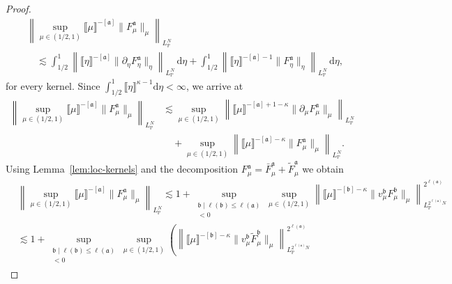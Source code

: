 \documentclass{article}
\numberwithin{equation}{section}
\newcommand{\mathd}{\mathrm{d}}
\theoremstyle{plain}
\theoremstyle{definition}
\begin{document}
\begin{proof}
\begin{align*}
    &\left\| \sup_{\mu \in (1 / 2, 1)}
    \llbracket \mu \rrbracket^{- [\mathfrak{a}]}
    \| F^{\mathfrak{a}}_{\mu} \|_{\mu} \right\|_{L^N_{\mathbb{P}}}\\
    &\quad \lesssim \int_{1 / 2}^1
    \left\| \llbracket \eta \rrbracket^{- [\mathfrak{a}]}
    \| \partial_{\eta} F^{\mathfrak{a}}_{\eta} \|_{\eta}
    \right\|_{L^N_{\mathbb{P}}}\,\mathd \eta
    + \int_{1 / 2}^1 \left\| \llbracket \eta \rrbracket^{- [\mathfrak{a}] - 1}
    \| F^{\mathfrak{a}}_{\eta} \|_{\eta}
    \right\|_{L^N_{\mathbb{P}}}\,\mathd \eta,
  \end{align*}
  for every kernel. Since $\int_{1 / 2}^1 \llbracket
  \eta \rrbracket^{\kappa - 1} \mathd \eta < \infty$, we arrive at
  \begin{align*}
    \left\| \sup_{\mu \in (1 / 2, 1)} \llbracket \mu \rrbracket^{- [\mathfrak{a}]}
    \| F^{\mathfrak{a}}_{\mu} \|_{\mu} \right\|_{L^N_{\mathbb{P}}}
    &\lesssim \sup_{\mu \in (1 / 2, 1)}
    \left\| \llbracket \mu \rrbracket^{- [\mathfrak{a}] + 1 - \kappa}
    \| \partial_{\mu} F^{\mathfrak{a}}_{\mu} \|_{\mu}
    \right\|_{L^N_{\mathbb{P}}}\\
    &\quad + \sup_{\mu \in (1 / 2, 1)}
    \left\| \llbracket \mu \rrbracket^{- [\mathfrak{a}] - \kappa}
    \| F^{\mathfrak{a}}_{\mu} \|_{\mu}
    \right\|_{L^N_{\mathbb{P}}} .
  \end{align*}
  Using Lemma~\ref{lem:loc-kernels} and the decomposition
  $F_{\mu}^{\mathfrak{a}} = \bar{F}_{\mu}^{\mathfrak{a}} +
  \tilde{F}_{\mu}^{\mathfrak{a}}$ we obtain
  \begin{align*}
    &\left\| \sup_{\mu \in (1 / 2, 1)} \llbracket \mu \rrbracket^{- [\mathfrak{a}]}
    \| F^{\mathfrak{a}}_{\mu} \|_{\mu} \right\|_{L^N_{\mathbb{P}}}
    \lesssim 
    1 + \sup_{\substack{\mathfrak{b}\mid
    \ell (\mathfrak{b}) \leqslant \ell(\mathfrak{a})\\ [\mathfrak{b}] < 0}}
    \sup_{\mu \in (1 / 2, 1)}
    \left\| \llbracket \mu \rrbracket^{- [\mathfrak{b}] - \kappa}
    \| v^{\mathfrak{b}}_{\mu} F^{\mathfrak{b}}_{\mu}
    \|_{\mu} \right\|_{L_{\mathbb{P}}^{2^{\ell(\mathfrak{a})} N}}^{2^{\ell(\mathfrak{a})}}\\
    &\lesssim 1 + \sup_{\substack{\mathfrak{b}\mid
    \ell (\mathfrak{b}) \leqslant \ell(\mathfrak{a})\\ [\mathfrak{b}] < 0}}
    \sup_{\mu \in (1 / 2, 1)}
    \left( \left\| \llbracket \mu \rrbracket^{- [\mathfrak{b}] - \kappa}
    \| v^{\mathfrak{b}}_{\mu} \tilde{F}^{\mathfrak{b}}_{\mu} \|_{\mu}
    \right\|^{2^{\ell(\mathfrak{a})}}_{L_{\mathbb{P}}^{2^{\ell(\mathfrak{a})} N}}

\end{align*}
\end{proof}
\end{document}
